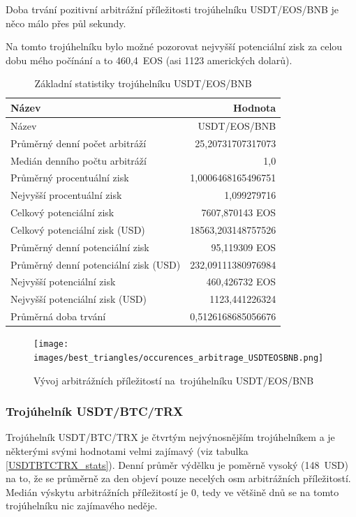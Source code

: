 \documentclass[thesis=B,czech]{FITthesis}[2019/03/21]
\begin{document}
Doba trvání pozitivní arbitrážní příležitosti trojúhelníku USDT/EOS/BNB je něco málo přes půl sekundy.

Na tomto trojúhelníku bylo možné pozorovat nejvyšší potenciální zisk za celou dobu mého počínání a to 460,4~EOS (asi 1123 amerických dolarů).

\begin{table}\centering
\caption{Základní statistiky trojúhelníku USDT/EOS/BNB}
\label{USDTEOSBNB_stats}
\begin{tabular}{|| l | r ||}
\hline Název & Hodnota \\ 
\hline\hline Název & USDT/EOS/BNB \\ 
\hline Průměrný denní počet arbitráží & 25,20731707317073 \\ 
\hline Medián denního počtu arbitráží & 1,0 \\ 
\hline Průměrný procentuální zisk & 1,0006468165496751 \\ 
\hline Nejvyšší procentuální zisk & 1,099279716 \\ 
\hline Celkový potenciální zisk & 7607,870143 EOS \\ 
\hline Celkový potenciální zisk (USD) & 18563,203148757526 \\ 
\hline Průměrný denní potenciální zisk & 95,119309 EOS \\ 
\hline Průměrný denní potenciální zisk (USD) & 232,09111380976984 \\ 
\hline Nejvyšší potenciální zisk & 460,426732 EOS \\ 
\hline Nejvyšší potenciální zisk (USD) & 1123,441226324 \\ 
\hline Průměrná doba trvání & 0,5126168685056676 \\ 
\hline
\end{tabular}
\end{table}

\begin{figure}\centering
	\texttt{[image: images/best\_triangles/occurences\_arbitrage\_USDTEOSBNB.png]}
	\caption{Vývoj arbitrážních příležitostí na~trojúhelníku USDT/EOS/BNB }\label{occurences_arbitrage_USDTEOSBNB}
\end{figure}

\subsubsection{Trojúhelník USDT/BTC/TRX}
Trojúhelník USDT/BTC/TRX je čtvrtým nejvýnosnějším trojúhelníkem a je některými svými hodnotami velmi zajímavý (viz tabulka \ref{USDTBTCTRX_stats}). Denní průměr výdělku je poměrně vysoký (148~USD) na to, že se průměrně za den objeví pouze necelých osm arbitrážních příležitostí. Medián výskytu arbitrážních příležitostí je 0, tedy ve většině dnů se na tomto trojúhelníku nic zajímavého neděje.
\end{document}
